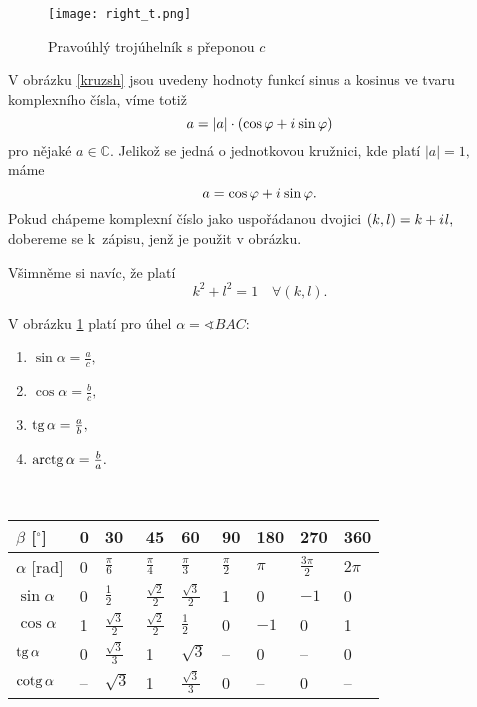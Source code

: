 \begin{figure}[ht!]
     \centering
     \texttt{[image: right\_t.png]}
     \caption{Pravoúhlý trojúhelník s přeponou $c$}
     \label{prav_t}
\end{figure}

\pagebreak

\begin{pozn}
    \par V obrázku \ref{kruzsh} jsou uvedeny hodnoty funkcí sinus a kosinus ve tvaru
    komplexního čísla, víme totiž
    $$ a = | a | \cdot (\cos \varphi + i\mkern1mu \sin \varphi)$$
    pro nějaké $a \in \mathbb C.$ Jelikož se jedná o jednotkovou kružnici, kde platí
    $|a| = 1,$ máme
    $$a=\cos \varphi +i\mkern1mu \sin \varphi. $$
    Pokud chápeme komplexní číslo jako uspořádanou dvojici $(k,l)=k+i\mkern1mu l,$
    dobereme se k~zápisu, jenž je použit v obrázku.
    \par Všimněme si navíc, že platí
    $$k^2+l^2=1 \,\,\,\,\,\, \forall (k,l).$$
\end{pozn}

\begin{pozn}
    V obrázku \ref{prav_t} platí pro úhel $\alpha = \sphericalangle BAC:$
    \begin{enumerate}[$i.$]
        \item $\sin \alpha= \frac{a}{c},$
        \item $\cos \alpha= \frac{b}{c},$
        \item $\operatorname{tg} \alpha= \frac{a}{b},$
        \item $\operatorname{arctg} \alpha= \frac{b}{a}.$
    \end{enumerate}
\end{pozn}

\begin{pozn}\,\\
    \begin{tabularx}{\textwidth}{| p{} || p{} | p{} |
    p{} | p{} | p{} | p{} | p{}
    | p{} |}
    \hline
    $\beta$ [$^\circ$] & 0 & 30 & 45 & 60 & 90 & 180 & 270 & 360 \\
    \hline
    $\alpha$ [rad] & 0 & $\frac{\pi}{6}$ & $\frac{\pi}{4}$ & $\frac{\pi}{3}$ & $\frac{\pi}{2}$ & $\pi$ & $\frac{3\pi}{2}$ & $2\pi$\\
    \hline
    $\sin \alpha$ & 0 & $\frac{1}{2}$ & $\frac{\sqrt{2}}{2}$ & $\frac{\sqrt{3}}{2}$ & 1 & 0 & $-1$ & 0\\
    \hline
    $\cos \alpha$ & 1 & $\frac{\sqrt{3}}{2}$ & $\frac{\sqrt{2}}{2}$ & $\frac{1}{2}$ & 0 & $-1$ & 0 & 1\\
    \hline
    $\operatorname{tg} \alpha$ & 0 & $\frac{\sqrt{3}}{3}$ & 1 & $\sqrt{3}$ & -- & 0 & -- & 0\\
    \hline
    $\operatorname{cotg} \alpha$ & -- & $\sqrt{3}$ & 1 & $\frac{\sqrt{3}}{3}$ & 0 & -- & 0 & --\\
    \hline
    \end{tabularx}
\end{pozn}


